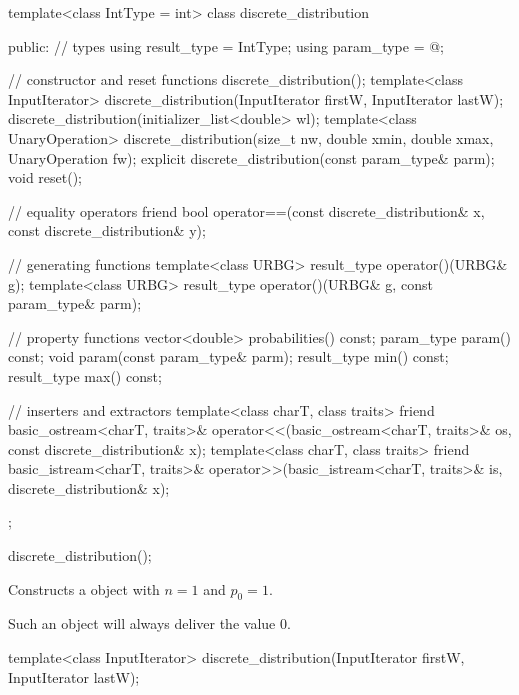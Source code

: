 %
%
\begin{codeblock}
template<class IntType = int>
  class discrete_distribution {
  public:
    // types
    using result_type = IntType;
    using param_type  = @\unspec@;

    // constructor and reset functions
    discrete_distribution();
    template<class InputIterator>
      discrete_distribution(InputIterator firstW, InputIterator lastW);
    discrete_distribution(initializer_list<double> wl);
    template<class UnaryOperation>
      discrete_distribution(size_t nw, double xmin, double xmax, UnaryOperation fw);
    explicit discrete_distribution(const param_type& parm);
    void reset();

    // equality operators
    friend bool operator==(const discrete_distribution& x, const discrete_distribution& y);

    // generating functions
    template<class URBG>
      result_type operator()(URBG& g);
    template<class URBG>
      result_type operator()(URBG& g, const param_type& parm);

    // property functions
    vector<double> probabilities() const;
    param_type param() const;
    void param(const param_type& parm);
    result_type min() const;
    result_type max() const;

    // inserters and extractors
    template<class charT, class traits>
      friend basic_ostream<charT, traits>&
        operator<<(basic_ostream<charT, traits>& os, const discrete_distribution& x);
    template<class charT, class traits>
      friend basic_istream<charT, traits>&
        operator>>(basic_istream<charT, traits>& is, discrete_distribution& x);
  };
\end{codeblock}

%
\begin{itemdecl}
discrete_distribution();
\end{itemdecl}

\begin{itemdescr}
\pnum
\effects
Constructs a  object
with $n = 1$ and $p_0 = 1$.
\begin{note}
Such an object will always deliver the value $0$.
\end{note}
\end{itemdescr}


%
\begin{itemdecl}
template<class InputIterator>
  discrete_distribution(InputIterator firstW, InputIterator lastW);
\end{itemdecl}

